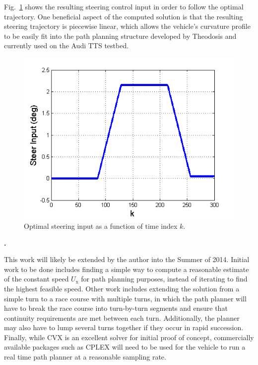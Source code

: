 \documentclass[10pt,a4paper]{article}
\def\section#1{\refstepcounter{section} \vspace{3.5mm} \noindent
{\normalsize\bf {\thesection.}} \hspace{0.5mm}{\normalsize\bf #1} \par \vspace{2mm}}
\begin{document}
Fig.~\ref{fig:steerInput} shows the resulting steering control input in order to follow the optimal trajectory. One beneficial aspect
of the computed solution is that the resulting steering trajectory is piecewise linear, which allows the vehicle's curvature profile 
to be easily fit into the path planning structure
developed by Theodosis \cite{theodosis} and currently used on the Audi TTS testbed. 

\begin{figure}[h]
\centering
\includegraphics[width=3 in]{figures/steerInput.png}
\caption{Optimal steering input as a function of time index $k$.}
\label{fig:steerInput}
\end{figure}


\section{FUTURE WORK}

This work will likely be extended by the author into the Summer of 2014. Initial work to be done includes finding a simple way to compute
a reasonable estimate of the constant speed $U_\mathrm{x}$ for path planning purposes, instead of iterating to find the highest feasible
speed. Other work includes extending the solution from a simple turn to a race course with multiple turns, in which the path planner
will have to break the race course into turn-by-turn segments and ensure that continuity requirements are met between each turn. Additionally,
the planner may also have to lump several turns together if they occur in rapid succession. Finally, while CVX is an excellent solver
for initial proof of concept, commercially available packages such as CPLEX will need to be used for the vehicle to run a real time
path planner at a reasonable sampling rate. \\


\end{document}
